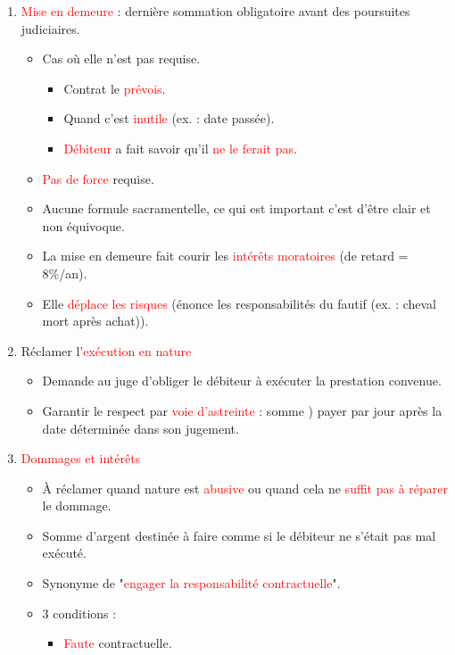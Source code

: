 \begin{enumerate}
	\item \textcolor{red}{Mise en demeure} : dernière sommation obligatoire avant des poursuites judiciaires.
	\begin{itemize}
		\item Cas où elle n'est pas requise.
		\begin{itemize}
			\item Contrat le \textcolor{red}{prévois}.
			\item Quand c'est \textcolor{red}{inutile} (ex. : date passée).
			\item \textcolor{red}{Débiteur} a fait savoir qu'il \textcolor{red}{ne le ferait pas}.
		\end{itemize}
		\item \textcolor{red}{Pas de force} requise.
		\item Aucune formule sacramentelle, ce qui est important c'est d'être clair et non équivoque.
		\item La mise en demeure fait courir les \textcolor{red}{intérêts moratoires} (de retard = 8\%/an).
		\item Elle \textcolor{red}{déplace les risques} (énonce les responsabilités du fautif (ex. : cheval mort après achat)).
	\end{itemize}
	\item Réclamer l'\textcolor{red}{exécution en nature}
	\begin{itemize}
		\item Demande au juge d'obliger le débiteur à exécuter la prestation convenue.
		\item Garantir le respect par \textcolor{red}{voie d'astreinte} : somme ) payer par jour après la date déterminée dans son jugement.
	\end{itemize}
	\item \textcolor{red}{Dommages et intérêts}
	\begin{itemize}
		\item À réclamer quand nature est \textcolor{red}{abusive} ou quand cela ne \textcolor{red}{suffit pas à réparer} le dommage.
		\item Somme d'argent destinée à faire comme si le débiteur ne s'était pas mal exécuté.
		\item Synonyme de "\textcolor{red}{engager la responsabilité contractuelle}".
		\item 3 conditions :
		\begin{itemize}
			\item \textcolor{red}{Faute} contractuelle.

\end{itemize}
\end{itemize}
\end{enumerate}
